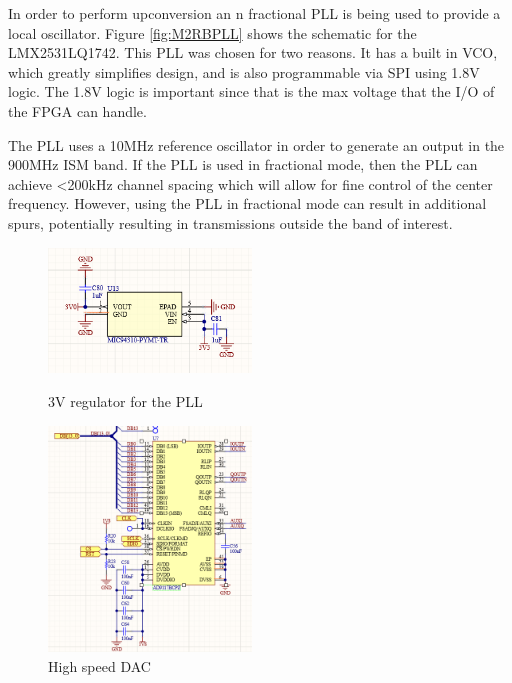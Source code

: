 \documentclass[crop=false]{standalone}
\begin{document}
        In order to perform upconversion an n fractional PLL is being used to provide a local oscillator. Figure \ref{fig:M2RBPLL} shows the schematic for the LMX2531LQ1742. This PLL was chosen for two reasons. It has a built in VCO, which greatly simplifies design, and is also programmable via SPI using 1.8V logic. The 1.8V logic is important since that is the max voltage that the I/O of the FPGA can handle.
        
        The PLL uses a 10MHz reference oscillator in order to generate an output in the 900MHz ISM band. If the PLL is used in fractional mode, then the PLL can achieve <200kHz channel spacing which will allow for fine control of the center frequency. However, using the PLL in fractional mode can result in additional spurs, potentially resulting in transmissions outside the band of interest.
                
        \begin{figure}
            \centering
            \includegraphics[width=0.48\textwidth]{M2RB3V.PNG}
            \caption{3V regulator for the PLL}
            \label{fig:M2RB3V}
            
            \smallskip\par
            
            \centering
            \includegraphics[width=0.48\textwidth]{M2RBDAC.PNG}
            \caption{High speed DAC}
            \label{fig:M2RBDAC}
        \end{figure}
        
\end{document}
